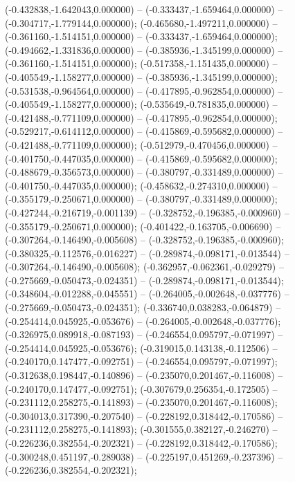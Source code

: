  (-0.432838,-1.642043,0.000000) -- (-0.333437,-1.659464,0.000000) -- (-0.304717,-1.779144,0.000000);
 (-0.465680,-1.497211,0.000000) -- (-0.361160,-1.514151,0.000000) -- (-0.333437,-1.659464,0.000000);
 (-0.494662,-1.331836,0.000000) -- (-0.385936,-1.345199,0.000000) -- (-0.361160,-1.514151,0.000000);
 (-0.517358,-1.151435,0.000000) -- (-0.405549,-1.158277,0.000000) -- (-0.385936,-1.345199,0.000000);
 (-0.531538,-0.964564,0.000000) -- (-0.417895,-0.962854,0.000000) -- (-0.405549,-1.158277,0.000000);
 (-0.535649,-0.781835,0.000000) -- (-0.421488,-0.771109,0.000000) -- (-0.417895,-0.962854,0.000000);
 (-0.529217,-0.614112,0.000000) -- (-0.415869,-0.595682,0.000000) -- (-0.421488,-0.771109,0.000000);
 (-0.512979,-0.470456,0.000000) -- (-0.401750,-0.447035,0.000000) -- (-0.415869,-0.595682,0.000000);
 (-0.488679,-0.356573,0.000000) -- (-0.380797,-0.331489,0.000000) -- (-0.401750,-0.447035,0.000000);
 (-0.458632,-0.274310,0.000000) -- (-0.355179,-0.250671,0.000000) -- (-0.380797,-0.331489,0.000000);
 (-0.427244,-0.216719,-0.001139) -- (-0.328752,-0.196385,-0.000960) -- (-0.355179,-0.250671,0.000000);
 (-0.401422,-0.163705,-0.006690) -- (-0.307264,-0.146490,-0.005608) -- (-0.328752,-0.196385,-0.000960);
 (-0.380325,-0.112576,-0.016227) -- (-0.289874,-0.098171,-0.013544) -- (-0.307264,-0.146490,-0.005608);
 (-0.362957,-0.062361,-0.029279) -- (-0.275669,-0.050473,-0.024351) -- (-0.289874,-0.098171,-0.013544);
 (-0.348604,-0.012288,-0.045551) -- (-0.264005,-0.002648,-0.037776) -- (-0.275669,-0.050473,-0.024351);
 (-0.336740,0.038283,-0.064879) -- (-0.254414,0.045925,-0.053676) -- (-0.264005,-0.002648,-0.037776);
 (-0.326975,0.089918,-0.087193) -- (-0.246554,0.095797,-0.071997) -- (-0.254414,0.045925,-0.053676);
 (-0.319015,0.143138,-0.112506) -- (-0.240170,0.147477,-0.092751) -- (-0.246554,0.095797,-0.071997);
 (-0.312638,0.198447,-0.140896) -- (-0.235070,0.201467,-0.116008) -- (-0.240170,0.147477,-0.092751);
 (-0.307679,0.256354,-0.172505) -- (-0.231112,0.258275,-0.141893) -- (-0.235070,0.201467,-0.116008);
 (-0.304013,0.317390,-0.207540) -- (-0.228192,0.318442,-0.170586) -- (-0.231112,0.258275,-0.141893);
 (-0.301555,0.382127,-0.246270) -- (-0.226236,0.382554,-0.202321) -- (-0.228192,0.318442,-0.170586);
 (-0.300248,0.451197,-0.289038) -- (-0.225197,0.451269,-0.237396) -- (-0.226236,0.382554,-0.202321);
